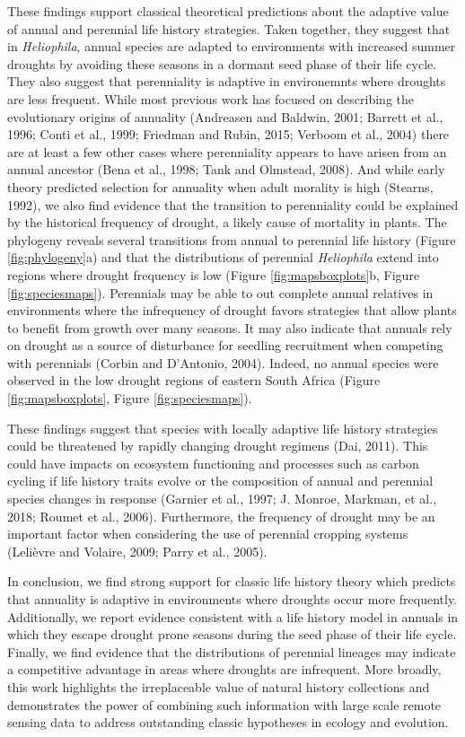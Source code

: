 \documentclass[man,floatsintext]{apa6}
\theoremstyle{definition}
\theoremstyle{definition}
\theoremstyle{definition}
\theoremstyle{remark}
\begin{document}
These findings support classical theoretical predictions about the
adaptive value of annual and perennial life history strategies. Taken
together, they suggest that in \emph{Heliophila}, annual species are
adapted to environments with increased summer droughts by avoiding these
seasons in a dormant seed phase of their life cycle. They also suggest
that perenniality is adaptive in environemnts where droughts are less
frequent. While most previous work has focused on describing the
evolutionary origins of annuality (Andreasen and Baldwin, 2001; Barrett
et al., 1996; Conti et al., 1999; Friedman and Rubin, 2015; Verboom et
al., 2004) there are at least a few other cases where perenniality
appears to have arisen from an annual ancestor (Bena et al., 1998; Tank
and Olmstead, 2008). And while early theory predicted selection for
annuality when adult morality is high (Stearns, 1992), we also find
evidence that the transition to perenniality could be explained by the
historical frequency of drought, a likely cause of mortality in plants.
The phylogeny reveals several transitions from annual to perennial life
history (Figure \ref{fig:phylogeny}a) and that the distributions of
perennial \emph{Heliophila} extend into regions where drought frequency
is low (Figure \ref{fig:mapsboxplots}b, Figure \ref{fig:speciesmaps}).
Perennials may be able to out complete annual relatives in environments
where the infrequency of drought favors strategies that allow plants to
benefit from growth over many seasons. It may also indicate that annuals
rely on drought as a source of disturbance for seedling recruitment when
competing with perennials (Corbin and D'Antonio, 2004). Indeed, no
annual species were observed in the low drought regions of eastern South
Africa (Figure \ref{fig:mapsboxplots}, Figure \ref{fig:speciesmaps}).

These findings suggest that species with locally adaptive life history
strategies could be threatened by rapidly changing drought regimens
(Dai, 2011). This could have impacts on ecosystem functioning and
processes such as carbon cycling if life history traits evolve or the
composition of annual and perennial species changes in response (Garnier
et al., 1997; J. Monroe, Markman, et al., 2018; Roumet et al., 2006).
Furthermore, the frequency of drought may be an important factor when
considering the use of perennial cropping systems (Lelièvre and Volaire,
2009; Parry et al., 2005).

In conclusion, we find strong support for classic life history theory
which predicts that annuality is adaptive in environments where droughts
occur more frequently. Additionally, we report evidence consistent with
a life history model in annuals in which they escape drought prone
seasons during the seed phase of their life cycle. Finally, we find
evidence that the distributions of perennial lineages may indicate a
competitive advantage in areas where droughts are infrequent. More
broadly, this work highlights the irreplaceable value of natural history
collections and demonstrates the power of combining such information
with large scale remote sensing data to address outstanding classic
hypotheses in ecology and evolution.
\end{document}

